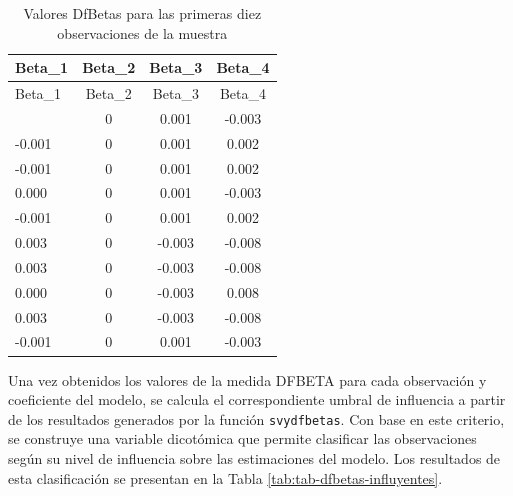 \documentclass[
  spanish,
  12pt,
]{book}
\begin{document}
\begin{longtable}[]{@{}lccc@{}}
\caption{\label{tab:tab-dfbetas-primeros}Valores DfBetas para las primeras diez observaciones de la muestra}\tabularnewline
\toprule\noalign{}
Beta\_1 & Beta\_2 & Beta\_3 & Beta\_4 \\
\midrule\noalign{}
\endfirsthead
\toprule\noalign{}
Beta\_1 & Beta\_2 & Beta\_3 & Beta\_4 \\
\midrule\noalign{}
\endhead
\bottomrule\noalign{}
\endlastfoot
0.000 & 0 & 0.001 & -0.003 \\
-0.001 & 0 & 0.001 & 0.002 \\
-0.001 & 0 & 0.001 & 0.002 \\
0.000 & 0 & 0.001 & -0.003 \\
-0.001 & 0 & 0.001 & 0.002 \\
0.003 & 0 & -0.003 & -0.008 \\
0.003 & 0 & -0.003 & -0.008 \\
0.000 & 0 & -0.003 & 0.008 \\
0.003 & 0 & -0.003 & -0.008 \\
-0.001 & 0 & 0.001 & -0.003 \\
\end{longtable}

Una vez obtenidos los valores de la medida DFBETA para cada observación y coeficiente del modelo, se calcula el correspondiente umbral de influencia a partir de los resultados generados por la función \texttt{svydfbetas}. Con base en este criterio, se construye una variable dicotómica que permite clasificar las observaciones según su nivel de influencia sobre las estimaciones del modelo. Los resultados de esta clasificación se presentan en la Tabla \ref{tab:tab-dfbetas-influyentes}.
\end{document}
